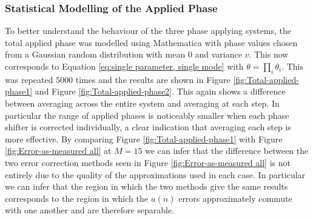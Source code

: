 \documentclass[aps,pra,twocolumn,superscriptaddress,numerical]{revtex4-1}
\begin{document}
		
		\subsubsection{Statistical Modelling of the Applied Phase\label{Statistical Modelling of the Applied Phase}}
		
		To better understand the behaviour of the three phase applying systems, the total applied phase was modelled using Mathematica with phase values chosen from a Gaussian random distribution with mean $0$ and variance $v$. This now corresponds to Equation \ref{eq:single parameter, single mode} with $\theta=\prod_{i}\theta_{i}$. This was repeated $5000$ times and the results are shown in Figure \ref{fig:Total-applied-phase1} and Figure \ref{fig:Total-applied-phase2}. This again shows a difference between averaging across the entire system and averaging at each step. In particular the range of applied phases is noticeably smaller when each phase shifter is corrected individually, a clear indication that averaging each step is more effective. By comparing Figure \ref{fig:Total-applied-phase1} with Figure \ref{fig:Error-as-measured all} at $M=15$ we can infer that the difference between the two error correction methods seen in Figure \ref{fig:Error-as-measured all} is not entirely due to the quality of the approximations used in each case. In particular we can infer that the region in which the two methods give the same results corresponds to the region in which the $u(n)$ errors approximately commute with one another and are therefore separable.
		
\end{document}
